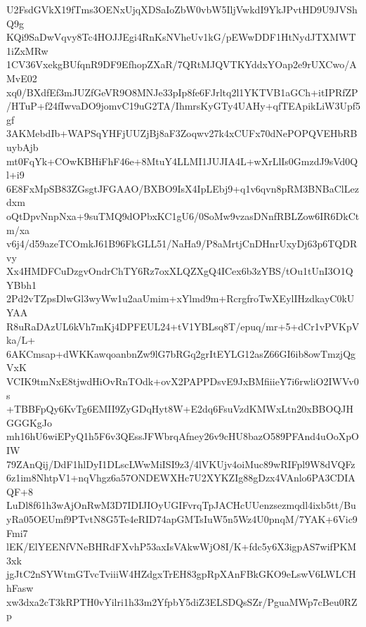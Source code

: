 U2FsdGVkX19fTms3OENxUjqXDSaIoZbW0vbW5IljVwkdI9YkJPvtHD9U9JVShQ9g
KQi9SaDwVqvy8Tc4HOJJEgi4RnKsNVheUv1kG/pEWwDDF1HtNydJTXMWT1iZxMRw
1CV36VxekgBUfqnR9DF9EfhopZXaR/7QRtMJQVTKYddxYOap2e9rUXCwo/AMvE02
xq0/BXdfEf3mJUZfGeVR9O8MNJe33pIp8fe6FJrltq2l1YKTVB1aGCh+itIPRfZP
/HTuP+f24fIwvaDO9jomvC19uG2TA/IhmrsKyGTy4UAHy+qfTEApikLiW3Upf5gf
3AKMebdIb+WAPSqYHFjUUZjBj8aF3Zoqwv27k4xCUFx70dNePOPQVEHbRBuybAjb
mt0FqYk+COwKBHiFhF46e+8MtuY4LLMI1JUJIA4L+wXrLlIs0GmzdJ9sVd0Ql+i9
6E8FxMpSB83ZGsgtJFGAAO/BXBO9IsX4IpLEbj9+q1v6qvn8pRM3BNBaClLezdxm
oQtDpvNnpNxa+9suTMQ9dOPbxKC1gU6/0SoMw9vzasDNnfRBLZow6IR6DkCtm/xa
v6j4/d59azeTCOmkJ61B96FkGLL51/NaHa9/P8aMrtjCnDHnrUxyDj63p6TQDRvy
Xx4HMDFCuDzgvOndrChTY6Rz7oxXLQZXgQ4ICex6b3zYBS/tOu1tUnI3O1QYBbh1
2Pd2vTZpsDlwGl3wyWw1u2aaUmim+xYlmd9m+RcrgfroTwXEylIHzdkayC0kUYAA
R8uRaDAzUL6kVh7mKj4DPFEUL24+tV1YBLsq8T/epuq/mr+5+dCr1vPVKpVka/L+
6AKCmsap+dWKKawqoanbnZw9lG7bRGq2grItEYLG12asZ66GI6ib8owTmzjQgVxK
VCIK9tmNxE8tjwdHiOvRnTOdk+ovX2PAPPDsvE9JxBMfiiieY7i6rwliO2IWVv0s
+TBBFpQy6KvTg6EMII9ZyGDqHyt8W+E2dq6FsuVzdKMWxLtn20xBBOQJHGGGKgJo
mh16hU6wiEPyQ1h5F6v3QEssJFWbrqAfney26v9cHU8bazO589PFAnd4uOoXpOIW
79ZAnQij/DdF1hlDyI1DLscLWwMiISI9z3/4lVKUjv4oiMuc89wRIFpl9W8dVQFz
6z1im8NhtpV1+nqVhgz6a57ONDEWXHc7U2XYKZIg88gDzx4VAnlo6PA3CDIAQF+8
LuDl8f61h3wAjOnRwM3D7IDIJIOyUGIFvrqTpJACHcUUenzsezmqdl4ixb5tt/Bu
yRa05OEUmf9PTvtN8G5Te4eRID74apGMTsIuW5n5Wz4U0pnqM/7YAK+6Vic9Fmi7
lEK/ElYEENfVNeBHRdFXvhP53axIsVAkwWjO8I/K+fdc5y6X3igpAS7wifPKM3xk
jgJtC2nSYWtmGTvcTviiiW4HZdgxTrEH83gpRpXAnFBkGKO9eLswV6LWLCHhFasw
xw3dxa2cT3kRPTH0vYilri1h33m2YfpbY5diZ3ELSDQsSZr/PguaMWp7cBeu0RZp
